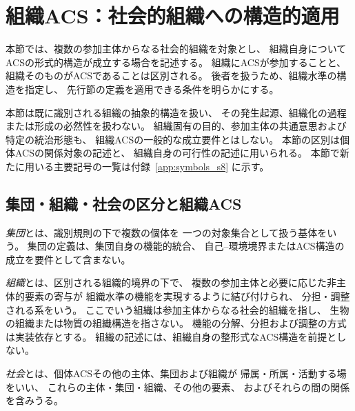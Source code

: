 \section{組織ACS：社会的組織への構造的適用}
\label{sec:org_acs}

本節では、複数の参加主体からなる社会的組織を対象とし、
組織自身についてACSの形式的構造が成立する場合を記述する。
組織にACSが参加することと、組織そのものがACSであることは区別される。
後者を扱うため、組織水準の構造を指定し、
先行節の定義を適用できる条件を明らかにする。

本節は既に識別される組織の抽象的構造を扱い、
その発生起源、組織化の過程または形成の必然性を扱わない。
組織固有の目的、参加主体の共通意思および特定の統治形態も、
組織ACSの一般的な成立要件とはしない。
本節の区別は個体ACSの関係対象の記述と、
組織自身の可行性の記述に用いられる。
本節で新たに用いる主要記号の一覧は付録~\ref{app:symbols_s8} に示す。

\subsection{集団・組織・社会の区分と組織ACS}
\label{subsec:org_terms}

\begin{definition}[集団・組織・社会の記述上の区分]
\label{def:org_terms}
\emph{集団}とは、識別規則の下で複数の個体を
一つの対象集合として扱う基体をいう。
集団の定義は、集団自身の機能的統合、
自己--環境境界またはACS構造の成立を要件として含まない。

\emph{組織}とは、区別される組織的境界の下で、
複数の参加主体と必要に応じた非主体的要素の寄与が
組織水準の機能を実現するように結び付けられ、
分担・調整される系をいう。
ここでいう組織は参加主体からなる社会的組織を指し、
生物の組織または物質の組織構造を指さない。
機能の分解、分担および調整の方式は実装依存とする。
組織の記述には、組織自身の整形式なACS構造を前提としない。

\emph{社会}とは、個体ACSその他の主体、集団および組織が
帰属・所属・活動する場をいい、
これらの主体・集団・組織、その他の要素、
およびそれらの間の関係を含みうる。
\end{definition}

